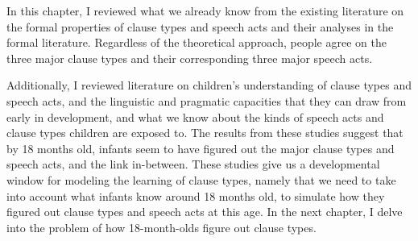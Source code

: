 In this chapter, I reviewed what we already know from the existing literature on the formal properties of clause types and speech acts and their analyses in the formal literature. Regardless of the theoretical approach, people agree on the three major clause types and their corresponding three major speech acts. 


Additionally, I reviewed literature on children's understanding of clause types and speech acts, and the linguistic and pragmatic capacities that they can draw from early in development, and what we know about the kinds of speech acts and clause types children are exposed to. The results from these studies suggest that by 18 months old, infants seem to have figured out the major clause types and speech acts, and the link in-between. These studies give us a developmental window for modeling the learning of clause types, namely that we need to take into account what infants know around 18 months old, to simulate how they figured out clause types and speech acts at this age. In the next chapter, I delve into the problem of how 18-month-olds figure out clause types. 









